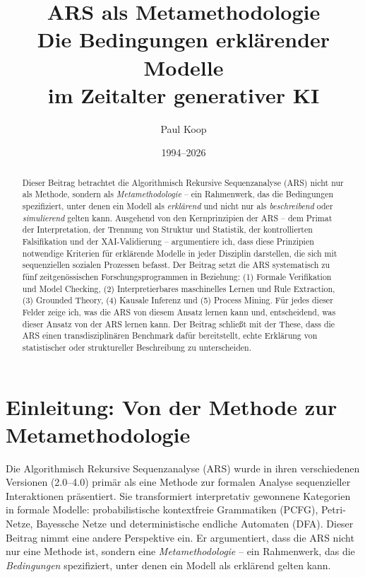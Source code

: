 \documentclass[12pt,a4paper]{article}
\title{\Huge\textbf{ARS als Metamethodologie} \\[2mm]
       \LARGE Die Bedingungen erklärender Modelle \\[2mm]
       \LARGE im Zeitalter generativer KI}
\author{
  \large
  \begin{tabular}{c}
    Paul Koop
  \end{tabular}
}
\date{\large 1994--2026}
\begin{document}
\maketitle

\begin{abstract}
Dieser Beitrag betrachtet die Algorithmisch Rekursive Sequenzanalyse (ARS) nicht 
nur als Methode, sondern als \textit{Metamethodologie} – ein Rahmenwerk, das die 
Bedingungen spezifiziert, unter denen ein Modell als \textit{erklärend} und nicht 
nur als \textit{beschreibend} oder \textit{simulierend} gelten kann. Ausgehend 
von den Kernprinzipien der ARS – dem Primat der Interpretation, der Trennung von 
Struktur und Statistik, der kontrollierten Falsifikation und der XAI-Validierung 
– argumentiere ich, dass diese Prinzipien notwendige Kriterien für erklärende 
Modelle in jeder Disziplin darstellen, die sich mit sequenziellen sozialen 
Prozessen befasst. Der Beitrag setzt die ARS systematisch zu fünf zeitgenössischen 
Forschungsprogrammen in Beziehung: (1) Formale Verifikation und Model Checking, 
(2) Interpretierbares maschinelles Lernen und Rule Extraction, (3) Grounded 
Theory, (4) Kausale Inferenz und (5) Process Mining. Für jedes dieser Felder 
zeige ich, was die ARS von diesem Ansatz lernen kann und, entscheidend, was 
dieser Ansatz von der ARS lernen kann. Der Beitrag schließt mit der These, dass 
die ARS einen transdisziplinären Benchmark dafür bereitstellt, echte Erklärung 
von statistischer oder struktureller Beschreibung zu unterscheiden.
\end{abstract}

\newpage
\tableofcontents
\newpage

\section{Einleitung: Von der Methode zur Metamethodologie}

Die Algorithmisch Rekursive Sequenzanalyse (ARS) wurde in ihren verschiedenen 
Versionen (2.0–4.0) primär als eine Methode zur formalen Analyse sequenzieller 
Interaktionen präsentiert. Sie transformiert interpretativ gewonnene Kategorien 
in formale Modelle: probabilistische kontextfreie Grammatiken (PCFG), Petri-Netze, 
Bayessche Netze und deterministische endliche Automaten (DFA). Dieser Beitrag 
nimmt eine andere Perspektive ein. Er argumentiert, dass die ARS nicht nur eine 
Methode ist, sondern eine \textit{Metamethodologie} – ein Rahmenwerk, das die 
\textit{Bedingungen} spezifiziert, unter denen ein Modell als erklärend gelten 
kann.
\end{document}
